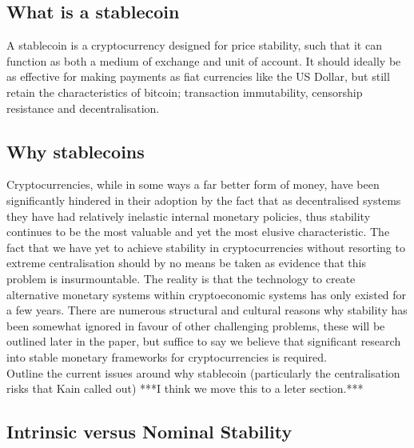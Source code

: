 \subsection{What is a stablecoin}

\noindent A stablecoin is a cryptocurrency designed for price stability, such that it can function as both a medium of exchange and unit of account. It should ideally be as effective for making payments as fiat currencies like the US Dollar, but still retain the characteristics of bitcoin; transaction immutability, censorship resistance and decentralisation. \\

\subsection{Why stablecoins}

\noindent Cryptocurrencies, while in some ways a far better form of money, have been significantly hindered in their adoption by the fact that as decentralised systems they have had relatively inelastic internal monetary policies, thus stability continues to be the most valuable and yet the most elusive characteristic. The fact that we have yet to achieve stability in cryptocurrencies without resorting to extreme centralisation should by no means be taken as evidence that this problem is insurmountable. The reality is that the technology to create alternative monetary systems within cryptoeconomic systems has only existed for a few years. There are numerous structural and cultural reasons why stability has been somewhat ignored in favour of other challenging problems, these will be outlined later in the paper, but suffice to say we believe that significant research into stable monetary frameworks for cryptocurrencies is required. \\

\noindent Outline the current issues around why stablecoin (particularly the centralisation risks that Kain called out) ***I think we move this to a leter section.*** \\

\subsection{Intrinsic versus Nominal Stability}

